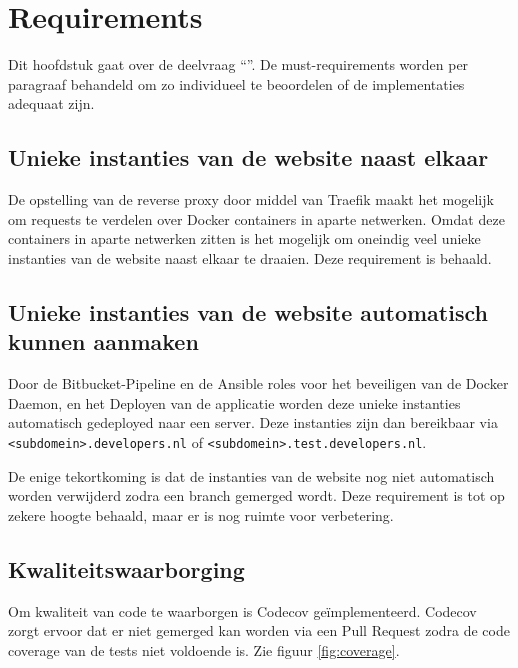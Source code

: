 \chapter{Requirements}

\label{Chapter7}

Dit hoofdstuk gaat over de deelvraag \enquote{\deelrequirements}. De must-requirements worden per paragraaf behandeld om zo individueel te beoordelen of de implementaties adequaat zijn.

\section{Unieke instanties van de website naast elkaar}
De opstelling van de reverse proxy door middel van Traefik maakt het mogelijk om requests te verdelen over Docker containers in aparte netwerken. Omdat deze containers in aparte netwerken zitten is het mogelijk om oneindig veel unieke instanties van de website naast elkaar te draaien. Deze requirement is behaald.

\section{Unieke instanties van de website automatisch kunnen aanmaken}
Door de Bitbucket-Pipeline en de Ansible roles voor het beveiligen van de Docker Daemon, en het Deployen van de applicatie worden deze unieke instanties automatisch gedeployed naar een server. Deze instanties zijn dan bereikbaar via \texttt{<subdomein>.developers.nl} of \texttt{<subdomein>.test.developers.nl}.

De enige tekortkoming is dat de instanties van de website nog niet automatisch worden verwijderd zodra een branch gemerged wordt. Deze requirement is tot op zekere hoogte behaald, maar er is nog ruimte voor verbetering.

\section{Kwaliteitswaarborging}
Om kwaliteit van code te waarborgen is Codecov geïmplementeerd. Codecov zorgt ervoor dat er niet gemerged kan worden via een Pull Request zodra de code coverage van de tests niet voldoende is. Zie figuur \ref{fig:coverage}.

